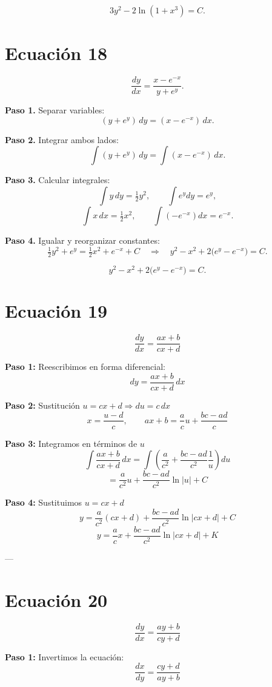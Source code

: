 \documentclass[12pt,a4paper]{article}
\begin{document}
\begin{multicols}{2}
	\[
	\boxed{3y^{2}-2\ln(1+x^{3})=C.}
	\]
	
	\section*{Ecuación 18}
	\[
	\frac{dy}{dx}=\frac{x-e^{-x}}{y+e^{y}}.
	\]
	
	\textbf{Paso 1.} Separar variables:
	\[
	(y+e^{y})\,dy=(x-e^{-x})\,dx.
	\]
	
	\textbf{Paso 2.} Integrar ambos lados:
	\[
	\int (y+e^{y})\,dy=\int (x-e^{-x})\,dx.
	\]
	
	\textbf{Paso 3.} Calcular integrales:
	\[
	\int y\,dy=\tfrac{1}{2}y^{2},\qquad \int e^{y}dy=e^{y},
	\]
	\[
	\int x\,dx=\tfrac{1}{2}x^{2},\qquad \int (-e^{-x})dx=e^{-x}.
	\]
	
	\textbf{Paso 4.} Igualar y reorganizar constantes:
	\[
	\tfrac{1}{2}y^{2}+e^{y}=\tfrac{1}{2}x^{2}+e^{-x}+C
	\quad\Rightarrow\quad
	y^{2}-x^{2}+2\bigl(e^{y}-e^{-x}\bigr)=C.
	\]
	
	\[
	\boxed{y^{2}-x^{2}+2\bigl(e^{y}-e^{-x}\bigr)=C.}
	\]

	
	\section*{Ecuación 19}
	\[
	\frac{dy}{dx} = \frac{a x + b}{c x + d}
	\]
	
	\textbf{Paso 1:} Reescribimos en forma diferencial:
	\[
	dy = \frac{a x + b}{c x + d}\,dx
	\]
	
	\textbf{Paso 2:} Sustitución \(u = c x + d \Rightarrow du = c\,dx\)
	\[
	x = \frac{u - d}{c}, \qquad a x + b = \frac{a}{c}u + \frac{bc - ad}{c}
	\]
	
	\textbf{Paso 3:} Integramos en términos de \(u\)
	\[
	\int \frac{a x + b}{c x + d}\,dx 
	= \int \left( \frac{a}{c^2} + \frac{bc - ad}{c^2}\frac{1}{u} \right) du
	\]
	\[
	= \frac{a}{c^2}u + \frac{bc - ad}{c^2}\ln|u| + C
	\]
	
	\textbf{Paso 4:} Sustituimos \(u = c x + d\)
	\[
	y = \frac{a}{c^2}(c x + d) + \frac{bc - ad}{c^2}\ln|c x + d| + C
	\]
	\[
	\boxed{y = \frac{a}{c}x + \frac{bc - ad}{c^2}\ln|c x + d| + K}
	\]
	
	---
	
	\section*{Ecuación 20}
	\[
	\frac{dy}{dx} = \frac{a y + b}{c y + d}
	\]
	
	\textbf{Paso 1:} Invertimos la ecuación:
	\[
	\frac{dx}{dy} = \frac{c y + d}{a y + b}
	\]
	

\end{multicols}
\end{document}
